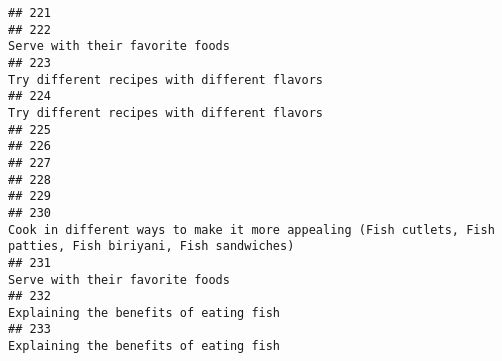 \documentclass[
]{article}
\begin{document}
\begin{verbatim}
## 221                                                                                                                                                                                                             
## 222                                                                                                                                                                              Serve with their favorite foods
## 223                                                                                                                                                                 Try different recipes with different flavors
## 224                                                                                                                                                                 Try different recipes with different flavors
## 225                                                                                                                                                                                                             
## 226                                                                                                                                                                                                             
## 227                                                                                                                                                                                                             
## 228                                                                                                                                                                                                             
## 229                                                                                                                                                                                                             
## 230                                                                                                Cook in different ways to make it more appealing (Fish cutlets, Fish patties, Fish biriyani, Fish sandwiches)
## 231                                                                                                                                                                              Serve with their favorite foods
## 232                                                                                                                                                                       Explaining the benefits of eating fish
## 233                                                                                                                                                                       Explaining the benefits of eating fish

\end{verbatim}
\end{document}
